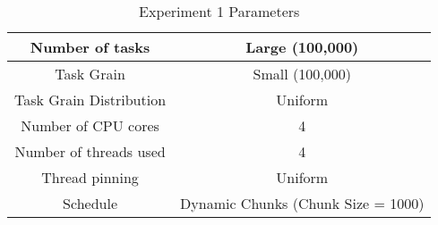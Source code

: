 \begin{table}
\centering
 \begin{tabular}{|c|c|}
  \hline
  Number of tasks & Large (100,000) \\
  \hline
  Task Grain & Small (100,000)\\
  \hline
  Task Grain Distribution & Uniform \\
  \hline
  Number of CPU cores & 4 \\
  \hline
  Number of threads used & 4 \\
  \hline
  Thread pinning & Uniform \\
  \hline
  Schedule & Dynamic Chunks (Chunk Size = 1000) \\
  \hline
 \end{tabular}
\caption{Experiment 1 Parameters}
\iflabela
\label{table:evaluation_ex1_parameters}
\fi
{}
\end{table}
